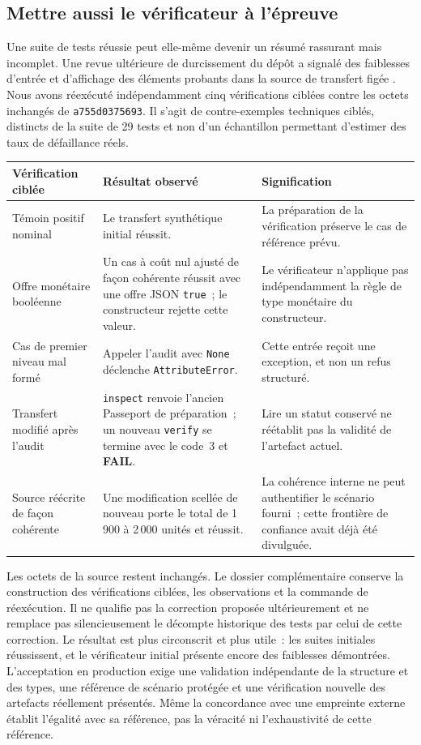 \documentclass[11pt,a4paper]{article}
\newcommand{\status}[1]{\textsf{\textbf{#1}}}
\begin{document}
\subsection{Mettre aussi le vérificateur à l’épreuve}\label{sec:checkerChallenge}
Une suite de tests réussie peut elle-même devenir un résumé rassurant mais incomplet. Une revue ultérieure de durcissement du dépôt a signalé des faiblesses d’entrée et d’affichage des éléments probants dans la source de transfert figée \cite{handoffHardening}. Nous avons réexécuté indépendamment cinq vérifications ciblées contre les octets inchangés de \texttt{a755d0375693}. Il s’agit de contre-exemples techniques ciblés, distincts de la suite de 29 tests et non d’un échantillon permettant d’estimer des taux de défaillance réels.

\begin{center}\small
\begin{tabularx}{\textwidth}{P{.24\textwidth}YY}
\toprule
\textbf{Vérification ciblée} & \textbf{Résultat observé} & \textbf{Signification}\\
\midrule
Témoin positif nominal & Le transfert synthétique initial réussit. & La préparation de la vérification préserve le cas de référence prévu.\\
Offre monétaire booléenne & Un cas à coût nul ajusté de façon cohérente réussit avec une offre JSON \texttt{true}~; le constructeur rejette cette valeur. & Le vérificateur n’applique pas indépendamment la règle de type monétaire du constructeur.\\
Cas de premier niveau mal formé & Appeler l’audit avec \texttt{None} déclenche \texttt{AttributeError}. & Cette entrée reçoit une exception, et non un refus structuré.\\
Transfert modifié après l’audit & \texttt{inspect} renvoie l’ancien Passeport de préparation~; un nouveau \texttt{verify} se termine avec le code~3 et \status{FAIL}. & Lire un statut conservé ne réétablit pas la validité de l’artefact actuel.\\
Source réécrite de façon cohérente & Une modification scellée de nouveau porte le total de 1\,900 à 2\,000 unités et réussit. & La cohérence interne ne peut authentifier le scénario fourni~; cette frontière de confiance avait déjà été divulguée.\\
\bottomrule
\end{tabularx}
\end{center}

Les octets de la source restent inchangés. Le dossier complémentaire conserve la construction des vérifications ciblées, les observations et la commande de réexécution. Il ne qualifie pas la correction proposée ultérieurement et ne remplace pas silencieusement le décompte historique des tests par celui de cette correction. Le résultat est plus circonscrit et plus utile~: les suites initiales réussissent, et le vérificateur initial présente encore des faiblesses démontrées. L’acceptation en production exige une validation indépendante de la structure et des types, une référence de scénario protégée et une vérification nouvelle des artefacts réellement présentés. Même la concordance avec une empreinte externe établit l’égalité avec sa référence, pas la véracité ni l’exhaustivité de cette référence.
\end{document}
